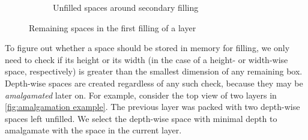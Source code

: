\begin{figure}[h]
\begin{subfigure}{.45\textwidth}
        \caption{Unfilled spaces around secondary filling}
        \label{fig:remaining spaces first filling WBH B}
    \end{subfigure}
    \caption{Remaining spaces in the first filling of a layer}
    \label{fig:remaining spaces first filling WBH}
\end{figure}

To figure out whether a space should be stored in memory for filling, we only need to check if its height or its width (in the case of a height- or width-wise space, respectively) is greater than the smallest dimension of any remaining box. Depth-wise spaces are created regardless of any such check, because they may be \emph{amalgamated} later on. For example, consider the top view of two layers in \cref{fig:amalgamation example}. The previous layer was packed with two depth-wise spaces left unfilled. We select the depth-wise space with minimal depth to amalgamate with the space in the current layer.

